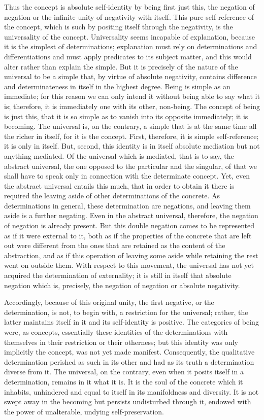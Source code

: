 Thus the concept is absolute self-identity
by being first just this, the negation of negation
or the infinite unity of negativity with itself.
This pure self-reference of the concept,
which is such by positing itself through the negativity,
is the universality of the concept.
Universality seems incapable of explanation,
because it is the simplest of determinations;
explanation must rely on determinations and differentiations
and must apply predicates to its subject matter,
and this would alter rather than explain the simple.
But it is precisely of the nature of
the universal to be a simple that,
by virtue of absolute negativity,
contains difference and determinateness
in itself in the highest degree.
Being is simple as an immediate;
for this reason we can only intend it
without being able to say what it is;
therefore, it is immediately one
with its other, non-being.
The concept of being is just this,
that it is so simple as to vanish
into its opposite immediately;
it is becoming.
The universal is, on the contrary,
a simple that is at the same time
all the richer in itself,
for it is the concept.
First, therefore, it is simple self-reference;
it is only in itself.
But, second, this identity is
in itself absolute mediation
but not anything mediated.
Of the universal which is mediated,
that is to say, the abstract universal,
the one opposed to the particular and the singular,
of that we shall have to speak only in connection
with the determinate concept.
Yet, even the abstract universal entails this much,
that in order to obtain it there is required
the leaving aside of other
determinations of the concrete.
As determinations in general,
these determination are negations,
and leaving them aside is a further negating.
Even in the abstract universal, therefore,
the negation of negation is already present.
But this double negation comes to be represented
as if it were external to it,
both as if the properties of the concrete
that are left out were different
from the ones that are retained
as the content of the abstraction,
and as if this operation of leaving some aside
while retaining the rest went on outside them.
With respect to this movement,
the universal has not yet acquired
the determination of externality;
it is still in itself that absolute negation
which is, precisely, the negation of negation
or absolute negativity.

Accordingly, because of this original unity,
the first negative, or the determination, is not,
to begin with, a restriction for the universal;
rather, the latter maintains itself in it
and its self-identity is positive.
The categories of being were, as concepts,
essentially these identities of the determinations
with themselves in their restriction or their otherness;
but this identity was only implicitly the concept,
was not yet made manifest.
Consequently, the qualitative determination
perished as such in its other
and had as its truth
a determination diverse from it.
The universal, on the contrary,
even when it posits itself in a determination,
remains in it what it is.
It is the soul of the concrete which it inhabits,
unhindered and equal to itself
in its manifoldness and diversity.
It is not swept away in the becoming
but persists undisturbed through it,
endowed with the power of unalterable,
undying self-preservation.


